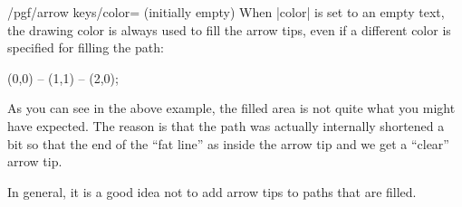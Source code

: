 \begin{key}{/pgf/arrow keys/color= (initially \normalfont empty)}
    When |color| is set to an empty text, the drawing color is always used to
    fill the arrow tips, even if a different color is specified for filling the
    path:
\begin{codeexample}[width=3cm,preamble={\usetikzlibrary{arrows.meta}}]
 \draw [draw=red, fill=red!50, arrows = {-Stealth[length=10pt]}]
                          (0,0) -- (1,1) -- (2,0);
\end{codeexample}
    As you can see in the above example, the filled area is not quite what you
    might have expected. The reason is that the path was actually internally
    shortened a bit so that the end of the ``fat line'' as inside the arrow tip
    and we get a ``clear'' arrow tip.

    In general, it is a good idea not to add arrow tips to paths that are
    filled.
\end{key}

